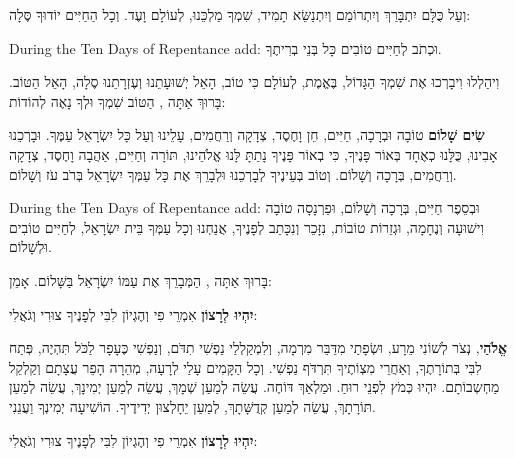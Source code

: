וְעַל כֻּלָּם יִתְבָּרַךְ וְיִתְרוֹמַם וְיִתְנַשֵּׂא תָמִיד, שִׁמְךָ מַלְכֵּנוּ, לְעוֹלָם וָעֶד. וְכָל הַחַיִּים יוֹדוּךָ סֶּלָה:

\begin{seasonal}{During the Ten Days of Repentance add:}
וּכְתֹב לְחַיִּים טוֹבִים כָּל בְּנֵי בְרִיתֶךָ.
\end{seasonal}

וִיהַלְלוּ וִיבָרְכוּ אֶת שִׁמְךָ הַגָּדוֹל, בֶּאֱמֶת, לְעוֹלָם כִּי טוֹב, הָאֵל יְשׁוּעָתֵנוּ וְעֶזְרָתֵנוּ סֶלָה, הָאֵל הַטּוֹב. בָּרוּךְ אַתָּה \Shem{}, הַטּוֹב שִׁמְךָ וּלְךָ נָאֶה לְהוֹדוֹת:

\textbf{שִׂים שָׁלוֹם} טוֹבָה וּבְרָכָה, חַיִּים, חֵן וָחֶסֶד, צְדָקָה וְרַחֲמִים, עָלֵינוּ וְעַל כָּל יִשְׂרָאֵל עַמֶּךָ. וּבָרְכֵנוּ אָבִינוּ, כֻּלָּנוּ כְאֶחָד בְּאוֹר פָּנֶיךָ, כִּי בְאוֹר פָּנֶיךָ נָתַתָּ לָּנוּ \Shem{} אֱלֹהֵינוּ, תּוֹרָה וְחַיִּים, אַהֲבָה וָחֶסֶד, צְדָקָה וְרַחֲמִים, בְּרָכָה וְשָׁלוֹם. וְטוֹב בְּעֵינֶיךָ לְבָרְכֵנוּ וּלְבָרֵךְ אֶת כָּל עַמְּךָ יִשְׂרָאֵל בְּרֹב עֹז וְשָׁלוֹם.

\begin{seasonal}{During the Ten Days of Repentance add:}
וּבְסֵפֶר חַיִּים, בְּרָכָה וְשָׁלוֹם, וּפַרְנָסָה טוֹבָה וִישׁוּעָה וְנֶחָמָה, וּגְזֵרוֹת טוֹבוֹת, נִזָּכֵר וְנִכָּתֵב לְפָנֶיךָ, אֲנַחְנוּ וְכָל עַמְּךָ בֵּית יִשְׂרָאֵל, לְחַיִּים טוֹבִים וּלְשָׁלוֹם.
\end{seasonal}

בָּרוּךְ אַתָּה \Shem{}, הַמְּבָרֵךְ אֶת עַמּוֹ יִשְׂרָאֵל בַּשָּׁלוֹם. אָמֵן:

\textbf{יִהְיוּ לְרָצוֹן} אִמְרֵי פִי וְהֶגְיוֹן לִבִּי לְפָנֶיךָ \Shem{} צוּרִי וְגֹאֲלִי:

\textbf{אֱלֹהַי}, נְצֹר לְשׁוֹנִי מֵרָע, וּשְׂפָתַי מִדַּבֵּר מִרְמָה, וְלִמְקַלְלַי נַפְשִׁי תִדֹּם, וְנַפְשִׁי כֶּעָפָר לַכֹּל תִּהְיֶה, פְּתַח לִבִּי בְּתוֹרָתֶךָ, וְאַחֲרֵי מִצְוֹתֶיךָ תִּרְדֹּף נַפְשִׁי. וְכָל הַקָּמִים עָלַי לְרָעָה, מְהֵרָה הָפֵר עֲצָתָם וְקַלְקֵל מַחְשְבוֹתָם. יִהְיוּ כְּמֹץ לִפְנֵי רוּחַ. וּמַלְאַךְ \Shem{} דּוֹחֶה. עֲשֵׂה לְמַעַן שְׁמָךְ, עֲשֵׂה לְמַעַן יְמִינָךְ, עֲשֵׂה לְמַעַן תּוֹרָתָךְ, עֲשֵׂה לְמַעַן קְדֻשָּׁתָךְ, לְמַעַן יֵחָלְצוּן יְדִידֶיךָ. הוֹשִׁיעָה יְמִינְךָ וַעֲנֵנִי.

\textbf{יִהְיוּ לְרָצוֹן} אִמְרֵי פִי וְהֶגְיוֹן לִבִּי לְפָנֶיךָ \Shem{} צוּרִי וְגֹאֲלִי:

